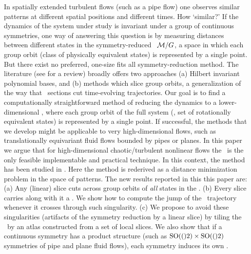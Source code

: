 

In spatially extended turbulent flows (such as a pipe flow) one observes
similar patterns at different spatial positions and different times. 
How `similar?' If the dynamics of the system under study is invariant under
a group of continuous symmetries, one way of answering this question is by
measuring distances between different states in the
symmetry-reduced \statesp\ $\pS/\Group$, a space in which each group orbit (class
of physically equivalent states) is represented by a single point.
But there exist no preferred, one-size fits all
symmetry-reduction method. The literature
(see  for a review) broadly
offers two approaches (a) Hilbert invariant polynomial bases, and (b) methods which
slice group orbits, a generalization of the way that \Poincare\ sections cut
time-evolving trajectories.
%
Our goal is to find a computationally straightforward method of reducing the dynamics to a lower-dimensional \statesp, where each group orbit of the full system (\ie, set of rotationally equivalent states) is represented by a single point. If successful, the methods that we develop might be applicable to very high-dimensional flows, such as translationally equivariant fluid flows bounded by pipes or planes.
%
In this paper we argue that for 
high-dimensional chaotic/turbulent nonlinear flows the
\mslices\ is the only feasible implementable and practical technique.
In this context, the method has been
studied in .
Here the method is rederived as a distance minimization problem in the
space of patterns. The new results reported in this this paper are:
    (a) Any (linear) slice cuts across group orbits of {\em all} states in
        the \statesp.
    (b) Every slice carries along with it a {\sset}. We show how
        to compute the jump of the \reducedsp\ trajectory whenever it crosses
        through such singularity.
    (c) We propose to avoid these singularities (artifacts of the symmetry
        reduction by a linear slice) by tiling the \statesp\ by an atlas
        constructed from a set of local slices.
We also show that if a continuous symmetry has a product structure (such as
$\textrm{SO}(()2) \times \textrm{SO}(()2)$ symmetries of pipe and plane fluid flows), each
symmetry induces its own {\sset}.

